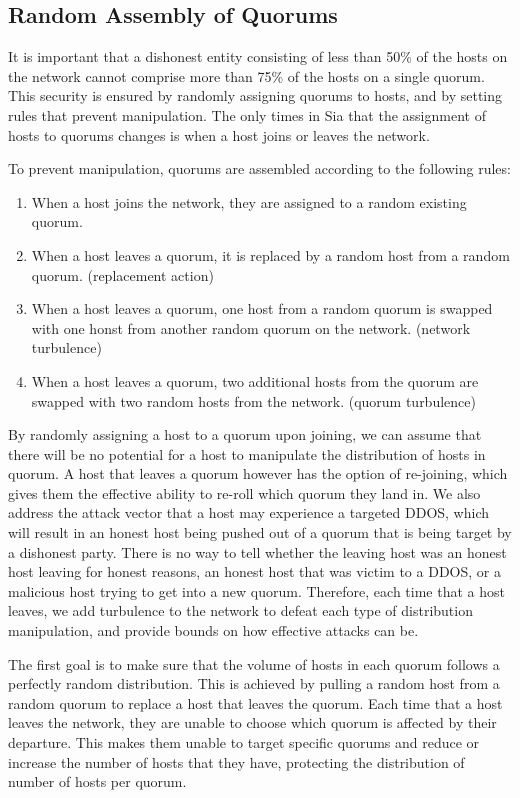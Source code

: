 \documentclass[twocolumn]{article}
\begin{document}
\subsection{Random Assembly of Quorums}
It is important that a dishonest entity consisting of less than 50\% of the hosts on the network cannot comprise more than 75\% of the hosts on a single quorum.
This security is ensured by randomly assigning quorums to hosts, and by setting rules that prevent manipulation.
The only times in Sia that the assignment of hosts to quorums changes is when a host joins or leaves the network.

To prevent manipulation, quorums are assembled according to the following rules:
\begin{enumerate}
	\item When a host joins the network, they are assigned to a random existing quorum.
	\item When a host leaves a quorum, it is replaced by a random host from a random quorum. (replacement action)
	\item When a host leaves a quorum, one host from a random quorum is swapped with one honst from another random quorum on the network. (network turbulence)
	\item When a host leaves a quorum, two additional hosts from the quorum are swapped with two random hosts from the network. (quorum turbulence)
\end{enumerate}

By randomly assigning a host to a quorum upon joining, we can assume that there will be no potential for a host to manipulate the distribution of hosts in quorum.
A host that leaves a quorum however has the option of re-joining, which gives them the effective ability to re-roll which quorum they land in.
We also address the attack vector that a host may experience a targeted DDOS, which will result in an honest host being pushed out of a quorum that is being target by a dishonest party.
There is no way to tell whether the leaving host was an honest host leaving for honest reasons, an honest host that was victim to a DDOS, or a malicious host trying to get into a new quorum.
Therefore, each time that a host leaves, we add turbulence to the network to defeat each type of distribution manipulation, and provide bounds on how effective attacks can be.

The first goal is to make sure that the volume of hosts in each quorum follows a perfectly random distribution.
This is achieved by pulling a random host from a random quorum to replace a host that leaves the quorum.
Each time that a host leaves the network, they are unable to choose which quorum is affected by their departure.
This makes them unable to target specific quorums and reduce or increase the number of hosts that they have, protecting the distribution of number of hosts per quorum.
\end{document}
